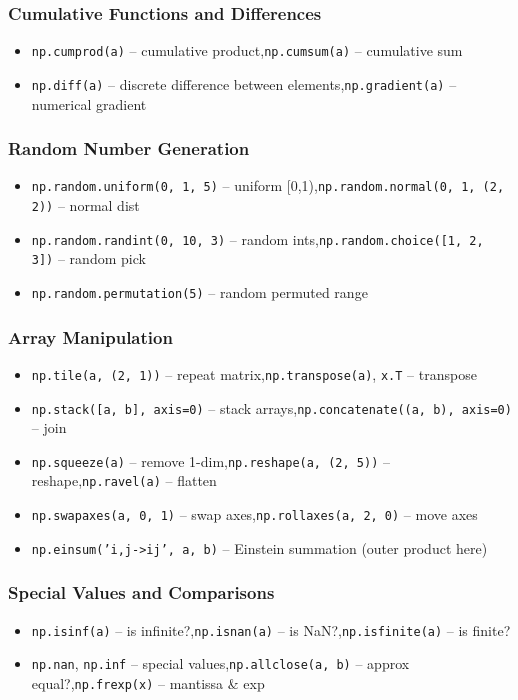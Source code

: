 \documentclass{article}
\begin{document}
\subsubsection*{Cumulative Functions and Differences}
\begin{itemize}
    \item \texttt{np.cumprod(a)} -- cumulative product,\quad \texttt{np.cumsum(a)} -- cumulative sum
    \item \texttt{np.diff(a)} -- discrete difference between elements,\quad \texttt{np.gradient(a)} -- numerical gradient
\end{itemize}

\subsubsection*{Random Number Generation}
\begin{itemize}
    \item \texttt{np.random.uniform(0, 1, 5)} -- uniform [0,1),\quad \texttt{np.random.normal(0, 1, (2, 2))} -- normal dist
    \item \texttt{np.random.randint(0, 10, 3)} -- random ints,\quad \texttt{np.random.choice([1, 2, 3])} -- random pick
    \item \texttt{np.random.permutation(5)} -- random permuted range
\end{itemize}

\subsubsection*{Array Manipulation}
\begin{itemize}
    \item \texttt{np.tile(a, (2, 1))} -- repeat matrix,\quad \texttt{np.transpose(a)}, \texttt{x.T} -- transpose
    \item \texttt{np.stack([a, b], axis=0)} -- stack arrays,\quad \texttt{np.concatenate((a, b), axis=0)} -- join
    \item \texttt{np.squeeze(a)} -- remove 1-dim,\quad \texttt{np.reshape(a, (2, 5))} -- reshape,\quad \texttt{np.ravel(a)} -- flatten
    \item \texttt{np.swapaxes(a, 0, 1)} -- swap axes,\quad \texttt{np.rollaxes(a, 2, 0)} -- move axes
    \item \texttt{np.einsum('i,j->ij', a, b)} -- Einstein summation (outer product here)
\end{itemize}

\subsubsection*{Special Values and Comparisons}
\begin{itemize}
    \item \texttt{np.isinf(a)} -- is infinite?,\quad \texttt{np.isnan(a)} -- is NaN?,\quad \texttt{np.isfinite(a)} -- is finite?
    \item \texttt{np.nan}, \texttt{np.inf} -- special values,\quad \texttt{np.allclose(a, b)} -- approx equal?,\quad \texttt{np.frexp(x)} -- mantissa & exp
\end{itemize}
\end{document}
